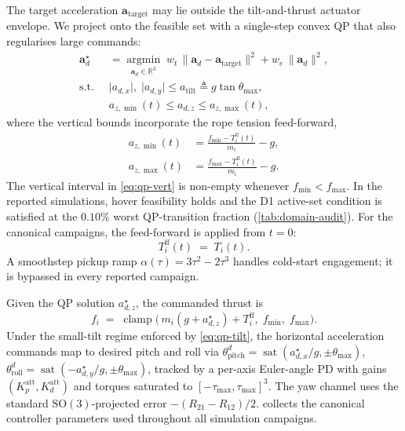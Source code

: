 \documentclass[lettersize,journal]{IEEEtran}
\newcommand{\SOthree}{\mathrm{SO}(3)}
\newcommand{\R}{\mathbb{R}}
\newcommand{\abs}[1]{\lvert #1 \rvert}
\newcommand{\vect}[1]{\boldsymbol{#1}}
\begin{document}
The target acceleration $\vect a_{\mathrm{target}}$ may lie outside the tilt-and-thrust actuator envelope. We project onto the feasible set with a single-step convex QP that also regularises large commands:
\begin{subequations}
\label{eq:qp}
\begin{align}
  \vect a_d^\star
    &= \operatorname*{argmin}_{\vect a_d \in \R^3}
      \; w_t\,\bigl\|\vect a_d - \vect a_{\mathrm{target}}\bigr\|^2
      + w_e\,\|\vect a_d\|^2,
    \label{eq:qp-cost} \\
  \text{s.t.}\;\;
    &\abs{a_{d,x}},\;\abs{a_{d,y}}
      \le a_{\mathrm{tilt}} \triangleq g\tan\theta_{\max},
    \label{eq:qp-tilt} \\
    &a_{z,\min}(t) \le a_{d,z} \le a_{z,\max}(t),
    \label{eq:qp-vert}
\end{align}
\end{subequations}
where the vertical bounds incorporate the rope tension feed-forward,
\begin{align}
\label{eq:az-bounds}
  a_{z,\min}(t) &= \frac{f_{\min} - T_i^{\mathrm{ff}}(t)}{m_i} - g,\\
  a_{z,\max}(t) &= \frac{f_{\max} - T_i^{\mathrm{ff}}(t)}{m_i} - g.\nonumber
\end{align}
The vertical interval in \eqref{eq:qp-vert} is non-empty whenever $f_{\min} < f_{\max}$. In the reported simulations, hover feasibility holds and the D1 active-set condition is satisfied at the $0.10\%$ worst QP-transition fraction (\cref{tab:domain-audit}). For the canonical campaigns, the feed-forward is applied from $t=0$:
\begin{equation}
  \boxed{T_i^{\mathrm{ff}}(t) \;=\; T_i(t).}
  \label{eq:Tff}
\end{equation}
A smoothstep pickup ramp $\alpha(\tau) = 3\tau^2 - 2\tau^3$ handles cold-start engagement; it is bypassed in every reported campaign.

Given the QP solution $a_{d,z}^\star$, the commanded thrust is
\begin{equation}
\label{eq:thrust}
  f_i \;=\; \operatorname{clamp}\!\bigl(\,
      m_i(g + a_{d,z}^\star) + T_i^{\mathrm{ff}},\;
      f_{\min},\; f_{\max}\bigr).
\end{equation}
Under the small-tilt regime enforced by \eqref{eq:qp-tilt}, the horizontal acceleration commands map to desired pitch and roll via $\theta^d_{\mathrm{pitch}}=\operatorname{sat}(a_{d,x}^\star/g,\pm\theta_{\max})$, $\theta^d_{\mathrm{roll}}=\operatorname{sat}(-a_{d,y}^\star/g,\pm\theta_{\max})$, tracked by a per-axis Euler-angle PD with gains $(K_p^{\mathrm{att}},K_d^{\mathrm{att}})$ and torques saturated to $[-\tau_{\max},\tau_{\max}]^3$. The yaw channel uses the standard $\SOthree$-projected error $-(R_{21}-R_{12})/2$.  collects the canonical controller parameters used throughout all simulation campaigns.
\end{document}
